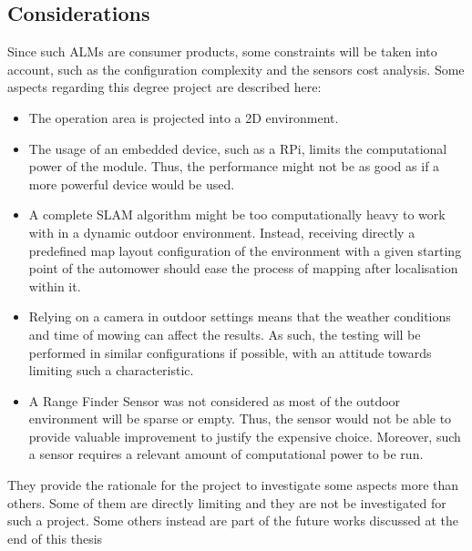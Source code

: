 \subsection{Considerations}

\noindent 
Since such \gls{ALM}s are consumer products, some constraints will be taken into account, such as the configuration complexity and the sensors cost analysis.
Some aspects regarding this degree project are described here:
\begin{itemize}
    \item The operation area is projected into a \Gls{2D} environment.
    \item The usage of an embedded device, such as a \gls{RPi}, limits the computational power of the module. Thus, the performance might not be as good as if a more powerful device would be used. %
    \item A complete \gls{SLAM} algorithm might be too computationally heavy to work with in a dynamic outdoor environment. 
    Instead, receiving directly a predefined map layout configuration of the environment with a given starting point of the automower should ease the process of mapping after localisation within it.
    \item Relying on a camera in outdoor settings means that the weather conditions and time of mowing can affect the results. 
    As such, the testing will be performed in similar configurations if possible, with an attitude towards limiting such a characteristic.
    \item A Range Finder Sensor was not considered as most of the outdoor environment will be sparse or empty.
    Thus, the sensor would not be able to provide valuable improvement to justify the expensive choice. 
    Moreover, such a sensor requires a relevant amount of computational power to be run.
\end{itemize}
They provide the rationale for the project to investigate some aspects more than others. 
Some of them are directly limiting and they are not be investigated for such a project.
Some others instead are part of the future works discussed at the end of this thesis


